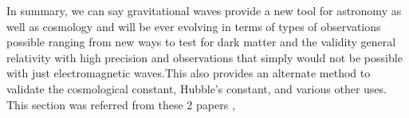 \hspace{1cm}In summary, we can say gravitational waves provide a new tool for astronomy as well as cosmology and will be ever evolving in terms of types of observations possible ranging from new ways to test for dark matter and the validity general relativity with high precision and observations that simply would not be possible with just electromagnetic waves.This also provides an alternate method to validate the cosmological constant, Hubble’s constant, and various other uses. This section was referred from these 2 papers \cite{Schutz_1999},\cite{Mukherjee_2020}

\pagebreak
